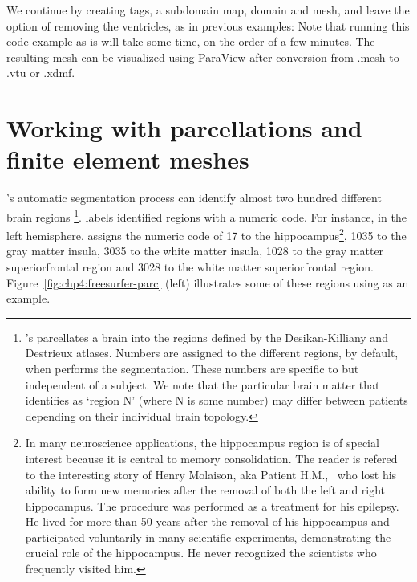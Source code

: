 We continue by creating tags, a subdomain map, domain and mesh, and
leave the option of removing the ventricles, as in previous examples:
 Note that
running this code example as is will take some time, on the order of a
few minutes. The resulting mesh can be visualized using ParaView
after conversion from .mesh to .vtu or .xdmf.

\section{Working with parcellations and finite element meshes} 
\label{sec:import-freesurfer-parcellation}
{\freesurfer}'s  automatic segmentation process can identify 
almost two hundred different brain regions%
\footnote{{\freesurfer}'s  parcellates a brain into the regions 
defined by the Desikan-Killiany and Destrieux atlases.  Numbers are assigned 
to the different regions, by default, when \freesurfer{} performs the 
segmentation. These numbers are specific to \freesurfer{} but independent of a 
subject.  We note that the particular brain matter that \freesurfer{} 
identifies as `region N' (where N is some number) may differ between patients 
depending on their individual brain topology.}.  {\freesurfer} labels 
identified regions with a numeric code.  For instance, in the left 
hemisphere, \freesurfer{} assigns the numeric code of 17 to the 
hippocampus\footnote{In many
  neuroscience applications, the hippocampus region is of special
  interest because it is central to memory consolidation. The reader
  is refered to the interesting story of Henry Molaison, aka Patient
  H.M.,~\cite{squire2009legacy, scoville1957loss} who lost his ability
  to form new memories after the removal of both the left and right
  hippocampus. The procedure was performed as a treatment for his
  epilepsy. He lived for more than 50 years after the removal of his
  hippocampus and participated voluntarily in many scientific
  experiments, demonstrating the crucial role of the hippocampus. He
  never recognized the scientists who frequently visited him.}, 1035
to the gray matter insula, 3035 to the white matter insula, 1028 to
the gray matter superiorfrontal region and 3028 to the white matter
superiorfrontal region. Figure~\ref{fig:chp4:freesurfer-parc} (left) illustrates 
some of these regions using  as an example. 
